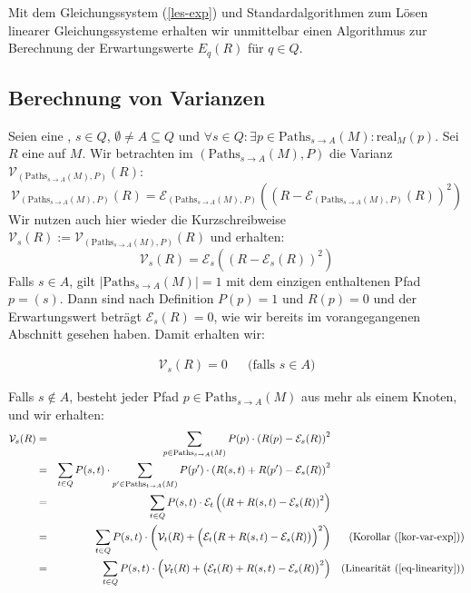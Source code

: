 \documentclass[a4paper]{article}
\theoremstyle{nonumberplain}
\begin{document}
{Mit dem Gleichungssystem (\ref{les-exp}) und Standardalgorithmen zum Lösen linearer Gleichungssysteme erhalten wir unmittelbar einen Algorithmus zur Berechnung der Erwartungswerte $E_q(R)$ für $q \in Q$.

\subsection{Berechnung von Varianzen}

Seien \mcex{} eine \mc{}, $s \in Q$, $\emptyset \neq A \subseteq Q$ und $\forall s \in Q: \exists p \in \mathrm{Paths}_{s \rightarrow A}(M) : \mathrm{real}_{M}(p)$. Sei $R$ eine  \reward{} auf $M$. Wir betrachten im \probspace{} $(\mathrm{Paths}_{s \rightarrow A}(M), P)$ die Varianz $\mathcal{V}_{(\mathrm{Paths}_{s \rightarrow A}(M), P)}(R)$:
\begin{equation}
	\mathcal{V}_{(\mathrm{Paths}_{s \rightarrow A}(M), P)}(R) = \mathcal{E}_{(\mathrm{Paths}_{s \rightarrow A}(M), P)}\left(\left(R - \mathcal{E}_{(\mathrm{Paths}_{s \rightarrow A}(M), P)} (R)\right)^{2}\right) 
\end{equation}
Wir nutzen auch hier wieder die Kurzschreibweise $\mathcal{V}_{s}(R) := \mathcal{V}_{(\mathrm{Paths}_{s \rightarrow A}(M), P)}(R)$ und erhalten:
\begin{equation}
\mathcal{V}_{s}(R) = \mathcal{E}_{s}\left(\left(R - \mathcal{E}_{s} (R)\right)^{2}\right)
\end{equation}
Falls $s \in A$, gilt $|\mathrm{Paths}_{s \rightarrow A}(M)| = 1$ mit dem einzigen enthaltenen Pfad $p = (s)$. Dann sind nach Definition $P(p) = 1$ und $R(p) = 0$ und der Erwartungswert beträgt $\mathcal{E}_{s}(R) = 0$, wie wir bereits im vorangegangenen Abschnitt gesehen haben. Damit erhalten wir:

\begin{align}
\mathcal{V}_{s}(R) = 0 && \text{(falls $s \in A$)}\label{var_trivial}
\end{align}

Falls $s \notin A$, besteht jeder Pfad $p \in \mathrm{Paths}_{s \rightarrow A}(M)$ aus mehr als einem Knoten, und wir erhalten:
\begin{align}
\mathcal{V}_{s}(R) & = & \sum_{p \in \mathrm{Paths}_{s \rightarrow A}(M)}{P(p) \cdot \left(R(p) - \mathcal{E}_{s}(R)\right)^2} \\
& = & \sum_{t \in Q}{ P(s,t) \cdot \sum_{p' \in \mathrm{Paths}_{t \rightarrow A}(M)}{ P(p') \cdot \left(R(s,t) + R(p') - \mathcal{E}_{s}(R)\right)^2 } } \\
& = & \sum_{t \in Q}{ P(s,t) \cdot \mathcal{E}_{t}\left(\left(R + R(s,t) - \mathcal{E}_{s}(R)\right)^2\right) } \\
& = & \sum_{t \in Q}{ P(s,t) \cdot \bigg(\mathcal{V}_{t}(R) + \Big(\mathcal{E}_{t}\big(R + R(s,t) - \mathcal{E}_{s}(R)\big)\Big)^2\bigg) } && \text{(Korollar (\ref{kor-var-exp}))}\\
& = & \sum_{t \in Q}{ P(s,t) \cdot \Big(\mathcal{V}_{t}(R) + \big(\mathcal{E}_{t}(R) + R(s,t) - \mathcal{E}_{s}(R)\big)^2\Big) } && \text{(Linearität (\ref{eq-linearity}))} \label{var_recursive}
\end{align}

}
\end{document}

